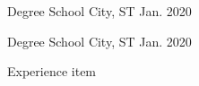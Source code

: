 

\begin{cventries}

  \cventry
    {Degree} %
    {School} %
    {City, ST} %
    {Jan. 2020} %
    \null

  \cventryup
    {Degree} %
    {School} %
    {City, ST} %
    {Jan. 2020} %
    {
      \begin{cvitems} %
        \item {Experience item}
      \end{cvitems}
    }

\end{cventries}
